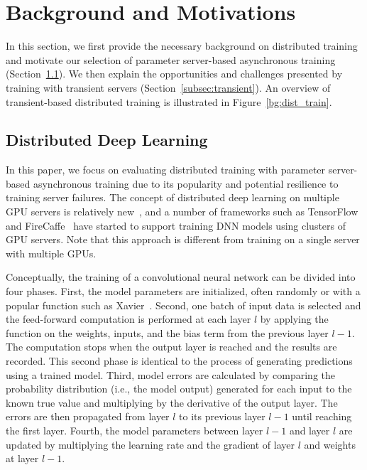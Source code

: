 \section{Background and Motivations}
\label{sec:bg}

In this section, we first provide the necessary background on distributed training
and motivate our selection of parameter server-based asynchronous training 
(Section~\ref{subsec:ddl}).  We then explain the opportunities and challenges
presented by training with transient servers (Section~\ref{subsec:transient}).
An overview of transient-based distributed training is illustrated in
Figure~\ref{bg:dist_train}.  


\subsection{Distributed Deep Learning}
\label{subsec:ddl}

In this paper, we focus on evaluating distributed training with parameter
server-based asynchronous training due to its popularity and potential
resilience to training server failures.  The concept of distributed deep
learning on multiple GPU servers is relatively new~\cite{jeffdean}, and a
number of frameworks such as TensorFlow~\cite{tensorflow} and
FireCaffe~\cite{firecaffe} have started to support training DNN models using
clusters of GPU servers. Note that this
approach is different from training on a single server with multiple GPUs. 


Conceptually, the training of a convolutional neural network can be divided
into four phases.
First, the model parameters are initialized, often randomly or with a popular function such as
Xavier~\cite{glorot2010understanding}.  Second, one batch of input data  is
selected and the feed-forward computation is performed at each layer $l$ by
applying the function on the weights, inputs, and the bias term from the
previous layer $l-1$. The computation stops when the output layer is reached
and the results are recorded.  This second phase is identical to
the process of generating predictions using a trained model.  Third, model
errors are calculated by comparing the probability distribution (i.e., the
model output) generated for each input  to the known  true value and
multiplying by the derivative of the output layer. The errors are then
propagated from layer $l$ to its previous layer $l-1$ until reaching the first
layer.  Fourth, the model parameters between layer $l-1$ and layer $l$ are
updated by multiplying the learning rate and the gradient of layer $l$ and
weights at layer $l-1$. 



